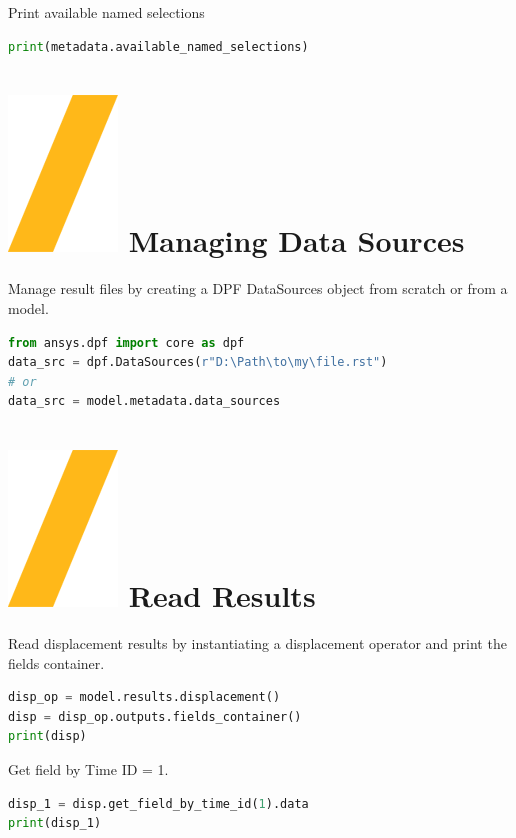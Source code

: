\documentclass[9pt,landscape]{article}
\begin{document}
\begin{multicols}{3}
Print available named selections
\begin{lstlisting}[language=Python]
print(metadata.available_named_selections)
\end{lstlisting}


\section{\includegraphics[height=\fontcharht\font`\S]{slash.png} Managing Data Sources}
Manage result files by creating a DPF DataSources object from scratch or from  a model.
\begin{lstlisting}[language=Python]
from ansys.dpf import core as dpf
data_src = dpf.DataSources(r"D:\Path\to\my\file.rst")
# or
data_src = model.metadata.data_sources
\end{lstlisting}


\section{\includegraphics[height=\fontcharht\font`\S]{slash.png} Read Results }
Read displacement results by instantiating a displacement operator and print the fields container.
\begin{lstlisting}[language=Python]
disp_op = model.results.displacement()
disp = disp_op.outputs.fields_container()
print(disp)
\end{lstlisting}

Get field by Time ID = 1.
\begin{lstlisting}[language=Python]
disp_1 = disp.get_field_by_time_id(1).data
print(disp_1)
\end{lstlisting}


\end{multicols}
\end{document}

